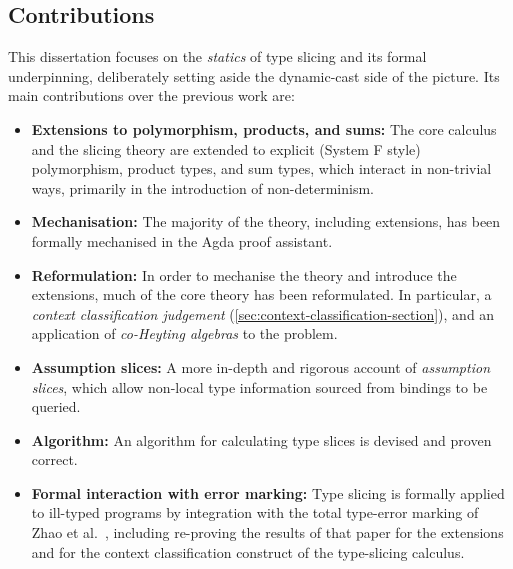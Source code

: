 \subsection{Contributions}
\label{sec:contributions}

This dissertation focuses on the \textit{statics} of type slicing and its formal underpinning, deliberately setting aside the dynamic-cast side of the picture. Its main contributions over the previous work are:

\begin{itemize}
\item \textbf{Extensions to polymorphism, products, and sums:} The core calculus and the slicing theory are extended to explicit (System F style) polymorphism, product types, and sum types, which interact in non-trivial ways, primarily in the introduction of non-determinism.

\item \textbf{Mechanisation:} The majority of the theory, including extensions, has been formally mechanised in the Agda proof assistant.

\item \textbf{Reformulation:} In order to mechanise the theory and introduce the extensions, much of the core theory has been reformulated. In particular, a \textit{context classification judgement} (\cref{sec:context-classification-section}), and an application of \textit{co-Heyting algebras} to the problem.

\item \textbf{Assumption slices:} A more in-depth and rigorous account of \textit{assumption slices}, which allow non-local type information sourced from bindings to be queried.

\item \textbf{Algorithm:} An algorithm for calculating type slices is devised and proven correct.

\item \textbf{Formal interaction with error marking:} Type slicing is formally applied to ill-typed programs by integration with the total type-error marking of Zhao et al.~\cite{Marking2024}, including re-proving the results of that paper for the extensions and for the context classification construct of the type-slicing calculus.
\end{itemize}

